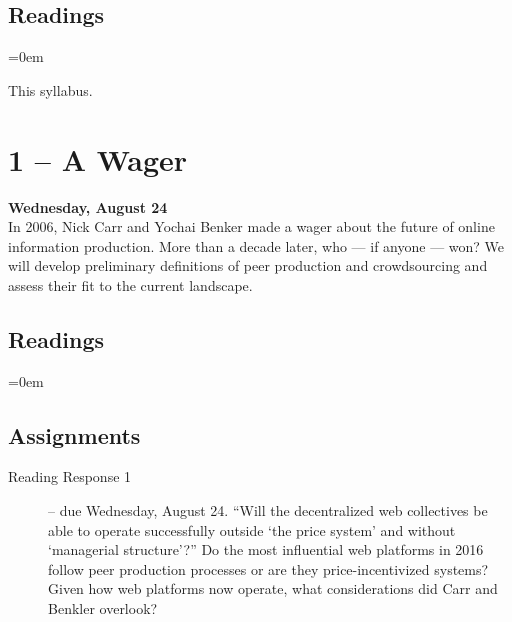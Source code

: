 \documentclass[11pt]{memoir}
\newenvironment{readinglist}{
\begin{list}{}{\leftmargin=8pt \itemindent=0em}
  \setlength{\itemsep}{8pt}
  \setlength{\parskip}{0em}
  \setlength{\parsep}{1em}
  \setlength{\parindent}{8em}}
{\end{list}}
\begin{document}
    \subsection{Readings}
    \begin{readinglist}
        \item This syllabus.
        \item {}
        \item {}
        \item {}
    \end{readinglist}


\section{1 -- A Wager}
\textcolor{CUGold}{\textbf{Wednesday, August 24}}\\
In 2006, Nick Carr and Yochai Benker made a wager about the future of online information production. More than a decade later, who --- if anyone --- won? We will develop preliminary definitions of peer production and crowdsourcing and assess their fit to the current landscape.

    \subsection{Readings}
    \begin{readinglist}
        \item {}
        \item {}
        \item {}
        \item {}
    \end{readinglist}

    \subsection{Assignments}
    \begin{description}%
        \item[Reading Response 1 ] -- due Wednesday, August 24. ``Will the decentralized web collectives be able to operate successfully outside `the price system' and without `managerial structure'?'' Do the most influential web platforms in 2016 follow peer production processes or are they price-incentivized systems? Given how web platforms now operate, what considerations did Carr and Benkler overlook?
    \end{description}
\end{document}
